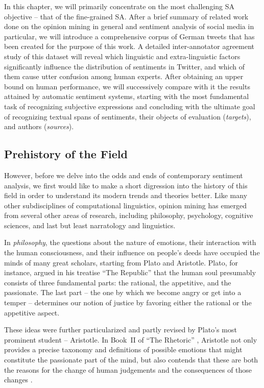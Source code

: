 In this chapter, we will primarily concentrate on the most challenging
SA objective -- that of the fine-grained SA.  After a brief summary of
related work done on the opinion mining in general and sentiment
analysis of social media in particular, we will introduce a
comprehensive corpus of German tweets that has been created for the
purpose of this work.  A detailed inter-annotator agreement study of
this dataset will reveal which linguistic and extra-linguistic factors
significantly influence the distribution of sentiments in Twitter, and
which of them cause utter confusion among human experts.  After
obtaining an upper bound on human performance, we will successively
compare with it the results attained by automatic sentiment systems,
starting with the most fundamental task of recognizing subjective
expressions and concluding with the ultimate goal of recognizing
textual spans of sentiments, their objects of evaluation
(\emph{targets}), and authors (\emph{sources}).

\subsection{Prehistory of the Field}

However, before we delve into the odds and ends of contemporary
sentiment analysis, we first would like to make a short digression
into the history of this field in order to understand its modern
trends and theories better.  Like many other subdisciplines of
computational linguistics, opinion mining has emerged from several
other areas of research, including philosophy, psychology, cognitive
sciences, and last but least narratology and linguistics.

In \emph{philosophy}, the questions about the nature of emotions,
their interaction with the human consciousness, and their influence on
people's deeds have occupied the minds of many great scholars,
starting from Plato and Aristotle.  Plato, for instance, argued in his
treatise ``The Republic'' \citep[Book~IV]{Plato:91} that the human
soul presumably consists of three fundamental parts: the rational, the
appetitive, and the passionate.  The last part -- the one by which we
become angry or get into a temper -- determines our notion of justice
by favoring either the rational or the appetitive aspect.

These ideas were further particularized and partly revised by Plato's
most prominent student -- Aristotle.  In Book~II of ``The Rhetoric''
\citep{Aristotle:54}, Aristotle not only provides a precise taxonomy
and definitions of possible emotions that might constitute the
passionate part of the mind, but also contends that these are both the
reasons for the change of human judgements and the consequences of
those changes \cite[cf.][p. 157]{Leighton:82}.

